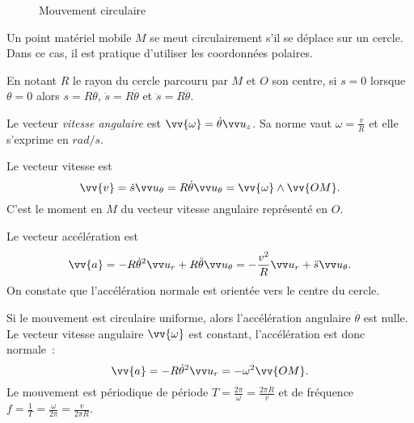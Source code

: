  \begin{figure}%
   \centering
   \caption{Mouvement circulaire}%
   \label{fig:mvt-circulaire}%
 \end{figure}%

Un point matériel mobile \(M\) se meut circulairement s'il se déplace sur un 
cercle. Dans ce cas, il est pratique d'utiliser les coordonnées polaires.

En notant \(R\) le rayon du cercle parcouru par \(M\) et \(O\) son centre, si 
\(s=0\) lorsque \(\theta=0\) alors \(s=R\theta\), \(\dot{s}=R\dot{\theta}\) et 
\(\ddot{s}=R\ddot{\theta}\).

Le vecteur \emph{vitesse angulaire} est \(\vv{\omega}=\dot{\theta}\uz\). Sa 
norme vaut \(\omega=\frac{v}{R}\) et elle s'exprime en \(\si{rad\per s}\).

Le vecteur vitesse est
\begin{equation}%
 \vv{v}=\dot{s}\utheta=R\dot{\theta} \utheta= \vv{\omega} \wedge \vv{OM}.%
\end{equation}%
C'est le moment en \(M\) du vecteur vitesse angulaire représenté en \(O\).

Le vecteur accélération est
\begin{equation}%
\vv{a}=-R\dot{\theta}^2\ur %
  +R\ddot{\theta}\utheta=-\frac{v^2}{R}\ur+\ddot{s}\utheta.
\end{equation}%
On constate que l'accélération normale est orientée vers le centre du cercle.

Si le mouvement est circulaire uniforme, alors l'accélération angulaire 
\(\ddot{\theta}\) est nulle. Le vecteur vitesse angulaire \(\vv{\omega}\) est 
constant, l'accélération est donc normale~:
\begin{equation}%
  \vv{a}=-R\dot{\theta}^2\ur =-\omega^2\vv{OM}.%
\end{equation}%
Le mouvement est périodique de période \(T=\frac{2\pi}{\omega}=\frac{2\pi 
R}{v}\) et de fréquence \(f=\frac{1}{T}=\frac{\omega}{2\pi}=\frac{v}{2\pi R}\).

